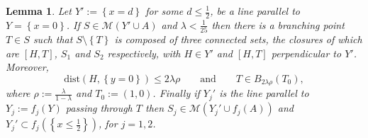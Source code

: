 \documentclass{amsart}
\newcommand{\ENCLOSE}[1]{\left\{#1\right\}}
\newcommand{\M}{\mathcal{M}}
\newcommand{\dist}{\mathrm{dist}}
\newtheorem{lemma}[theorem]{Lemma}
\theoremstyle{definition}
\theoremstyle{remark}
\begin{document}
\begin{lemma}\label{lm:branching}
  Let $Y':=\ENCLOSE{x=d}$ for some $d\le\frac 1 2$,
  be a line parallel to $Y=\ENCLOSE{x=0}$.
  If $S\in \M(Y'\cup A)$
  and $\lambda < \frac 1 {25}$ then
  there is a branching point $T\in S$ 
  such that $S\setminus \ENCLOSE{T}$ is composed of 
  three connected sets, the closures of which are
   $[H,T]$, $S_1$ and $S_2$ respectively,
  with $H\in Y'$ and $[H,T]$ perpendicular to $Y'$.  
  Moreover, 
  \begin{equation}\label{eq:474947}
    \dist(H,\ENCLOSE{y=0})\le 2\lambda\rho
    \qquad\text{and}\qquad 
    T\in B_{2\lambda\rho}(T_0), 
  \end{equation}
  where $\rho:=\frac{\lambda}{1-\lambda}$ and $T_0:=(1,0)$.
  Finally if $Y_j'$ is the line parallel to $Y_j:=f_j(Y)$ 
  passing through $T$ 
  then $S_j \in \M(Y_j'\cup f_j(A))$ 
  and $Y_j'\subset f_j(\ENCLOSE{x\le\frac 1 2})$,
  for $j=1,2$.
\end{lemma}
\end{document}
